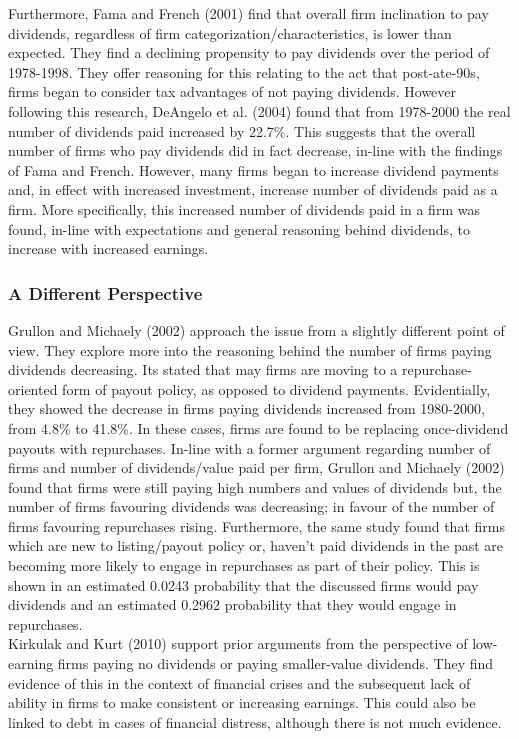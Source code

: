 \documentclass[11pt, english]{article}
\begin{document}
	Furthermore, Fama and French (2001) find that overall firm inclination to pay dividends, regardless of firm categorization/characteristics, is lower than expected. They find a declining propensity to pay dividends over the period of 1978-1998. They offer reasoning for this relating to the act that post-ate-90s, firms began to consider tax advantages of not paying dividends. However following this research, DeAngelo et al. (2004) found that from 1978-2000 the real number of dividends paid increased by 22.7\%. This suggests that the overall number of firms who pay dividends did in fact decrease, in-line with the findings of Fama and French. However, many firms began to increase dividend payments and, in effect with increased investment, increase number of dividends paid as a firm. More specifically, this increased number of dividends paid in a firm was found, in-line with expectations and general reasoning behind dividends, to increase with increased earnings.

		\subsubsection*{A Different Perspective}

	Grullon and Michaely (2002) approach the issue from a slightly different point of view. They explore more into the reasoning behind the number of firms paying dividends decreasing. Its stated that may firms are moving to a repurchase- oriented form of payout policy, as opposed to dividend payments. Evidentially, they showed the decrease in firms paying dividends increased from 1980-2000, from 4.8\% to 41.8\%. In these cases, firms are found to be replacing once-dividend payouts with repurchases. In-line with a former argument regarding number of firms and number of dividends/value paid per firm, Grullon and Michaely (2002) found that firms were still paying high numbers and values of dividends but, the number of firms favouring dividends was decreasing; in favour of the number of firms favouring repurchases rising. Furthermore, the same study found that firms which are new to listing/payout policy or, haven’t paid dividends in the past are becoming more likely to engage in repurchases as part of their policy. This is shown in an estimated 0.0243 probability that the discussed firms would pay dividends and an estimated 0.2962 probability that they would engage in repurchases.\\

	Kirkulak and Kurt (2010) support prior arguments from the perspective of low- earning firms paying no dividends or paying smaller-value dividends. They find evidence of this in the context of financial crises and the subsequent lack of ability in firms to make consistent or increasing earnings. This could also be linked to debt in cases of financial distress, although there is not much evidence.
\end{document}
